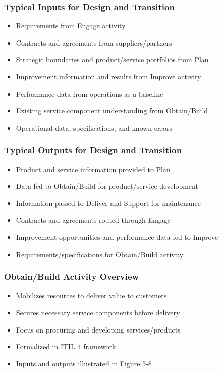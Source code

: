 \documentclass[aspectratio=169, table]{beamer}
\begin{document}
\begin{frame}
	\frametitle{Typical Inputs for Design and Transition}
	\begin{itemize}
		\item Requirements from Engage activity
		\item Contracts and agreements from suppliers/partners
		\item Strategic boundaries and product/service portfolios from Plan
		\item Improvement information and results from Improve activity
		\item Performance data from operations as a baseline
		\item Existing service component understanding from Obtain/Build
		\item Operational data, specifications, and known errors
	\end{itemize}
\end{frame}

\begin{frame}
	\frametitle{Typical Outputs for Design and Transition}
	\begin{itemize}
		\item Product and service information provided to Plan
		\item Data fed to Obtain/Build for product/service development
		\item Information passed to Deliver and Support for maintenance
		\item Contracts and agreements routed through Engage
		\item Improvement opportunities and performance data fed to Improve
		\item Requirements/specifications for Obtain/Build activity
	\end{itemize}
\end{frame}

\begin{frame}
	\frametitle{Obtain/Build Activity Overview}
	\begin{itemize}
		\item Mobilizes resources to deliver value to customers
		\item Secures necessary service components before delivery
		\item Focus on procuring and developing services/products
		\item Formalized in ITIL 4 framework
		\item Inputs and outputs illustrated in Figure 5-8
	\end{itemize}
\end{frame}
\end{document}
